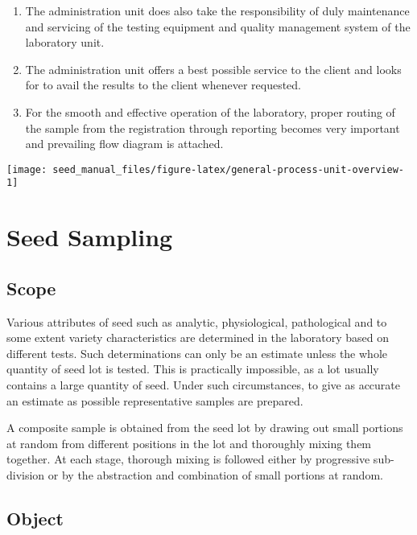 \documentclass[
]{book}
\begin{document}
\begin{enumerate}
\item
  The administration unit does also take the responsibility of duly maintenance and servicing of the testing equipment and quality management system of the laboratory unit.
\item
  The administration unit offers a best possible service to the client and looks for to avail the results to the client whenever requested.
\item
  For the smooth and effective operation of the laboratory, proper routing of the sample from the registration through reporting becomes very important and prevailing flow diagram is attached.
\end{enumerate}

\begin{center}\texttt{[image: seed\_manual\_files/figure-latex/general-process-unit-overview-1]} \end{center}

\hypertarget{seed-sampling}{%
\section{Seed Sampling}\label{seed-sampling}}

\hypertarget{scope}{%
\subsection{Scope}\label{scope}}

Various attributes of seed such as analytic, physiological, pathological and to some extent variety characteristics are determined in the laboratory based on different tests. Such determinations can only be an estimate unless the whole quantity of seed lot is tested. This is practically impossible, as a lot usually contains a large quantity of seed. Under such circumstances, to give as accurate an estimate as possible representative samples are prepared.

A composite sample is obtained from the seed lot by drawing out small portions at random from different positions in the lot and thoroughly mixing them together. At each stage, thorough mixing is followed either by progressive sub-division or by the abstraction and combination of small portions at random.

\hypertarget{object}{%
\subsection{Object}\label{object}}
\end{document}
